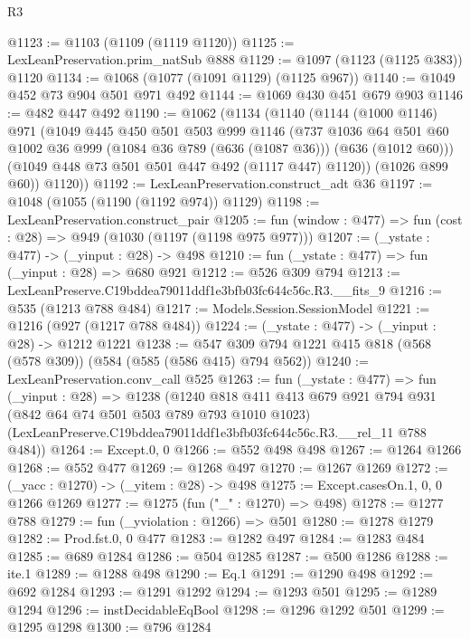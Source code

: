 \begin{lexlean}{R3}
\begin{coremodule}
@1123 := @1103 (@1109 (@1119 @1120))
@1125 := LexLeanPreservation.prim_natSub @888
@1129 := @1097 (@1123 (@1125 @383)) @1120
@1134 := @1068 (@1077 (@1091 @1129) (@1125 @967))
@1140 := @1049 @452 @73 @904 @501 @971 @492
@1144 := @1069 @430 @451 @679 @903
@1146 := @482 @447 @492
@1190 := @1062
    (@1134
      (@1140
        (@1144
          (@1000 @1146)
          @971
          (@1049
            @445
            @450
            @501
            @503
            @999
            @1146
            (@737
              @1036
              @64
              @501
              @60
              @1002
              @36
              @999
              (@1084 @36 @789 (@636 (@1087 @36)))
              (@636 (@1012 @60)))
            (@1049 @448 @73 @501 @501 @447 @492 (@1117 @447) @1120))
          (@1026 @899 @60))
        @1120))
@1192 := LexLeanPreservation.construct_adt @36
@1197 := @1048 (@1055 (@1190 (@1192 @974)) @1129)
@1198 := LexLeanPreservation.construct_pair
@1205 := fun (window : @477) => fun (cost : @28) => @949 (@1030 (@1197 (@1198 @975 @977)))
@1207 := (_ystate : @477) -> (_yinput : @28) -> @498
@1210 := fun (_ystate : @477) => fun (_yinput : @28) => @680 @921
@1212 := @526 @309 @794
@1213 := LexLeanPreserve.C19bddea79011ddf1e3bfb03fc644c56c.R3.__fits_9
@1216 := @535 (@1213 @788 @484)
@1217 := Models.Session.SessionModel
@1221 := @1216 (@927 (@1217 @788 @484))
@1224 := (_ystate : @477) -> (_yinput : @28) -> @1212 @1221
@1238 := @547 @309 @794 @1221 @415 @818 (@568 (@578 @309)) (@584 (@585 (@586 @415) @794 @562))
@1240 := LexLeanPreservation.conv_call @525
@1263 := fun (_ystate : @477) =>
  fun (_yinput : @28) =>
  @1238
    (@1240
      @818
      @411
      @413
      @679
      @921
      @794
      @931
      (@842 @64 @74 @501 @503 @789 @793 @1010 @1023)
      (LexLeanPreserve.C19bddea79011ddf1e3bfb03fc644c56c.R3.__rel_11 @788 @484))
@1264 := Except.{0, 0}
@1266 := @552 @498 @498
@1267 := @1264 @1266
@1268 := @552 @477
@1269 := @1268 @497
@1270 := @1267 @1269
@1272 := (_yacc : @1270) -> (_yitem : @28) -> @498
@1275 := Except.casesOn.{1, 0, 0} @1266 @1269
@1277 := @1275 (fun ("_" : @1270) => @498)
@1278 := @1277 @788
@1279 := fun (_yviolation : @1266) => @501
@1280 := @1278 @1279
@1282 := Prod.fst.{0, 0} @477
@1283 := @1282 @497
@1284 := @1283 @484
@1285 := @689 @1284
@1286 := @504 @1285
@1287 := @500 @1286
@1288 := ite.{1}
@1289 := @1288 @498
@1290 := Eq.{1}
@1291 := @1290 @498
@1292 := @692 @1284
@1293 := @1291 @1292
@1294 := @1293 @501
@1295 := @1289 @1294
@1296 := instDecidableEqBool
@1298 := @1296 @1292 @501
@1299 := @1295 @1298
@1300 := @796 @1284

\end{coremodule}
\end{lexlean}
